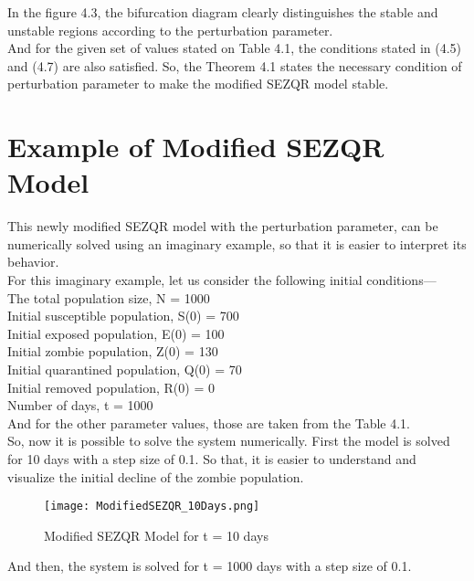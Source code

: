 In the figure 4.3, the bifurcation diagram clearly distinguishes the stable and unstable regions according to the perturbation parameter. \\

And for the given set of values stated on Table 4.1, the conditions stated in (4.5) and (4.7) are also satisfied. So, the Theorem 4.1 states the necessary condition of perturbation parameter to make the modified SEZQR model stable.

\pagebreak
\section{Example of Modified SEZQR Model}

This newly modified SEZQR model with the perturbation parameter, can be numerically solved using an imaginary example, so that it is easier to interpret its behavior. \\

\noindent For this imaginary example, let us consider the following initial conditions--- \\

\noindent The total population size, N = 1000 \\
Initial susceptible population, S(0) = 700 \\
Initial exposed population, E(0) = 100 \\
Initial zombie population, Z(0) = 130 \\
Initial quarantined population, Q(0) = 70 \\
Initial removed population, R(0) = 0 \\
Number of days, t = 1000 \\

And for the other parameter values, those are taken from the Table 4.1. \\

So, now it is possible to solve the system numerically. First the model is solved for 10 days with a step size of 0.1. So that, it is easier to understand and visualize the initial decline of the zombie population. \\

\begin{figure}[H]
\centering
\texttt{[image: ModifiedSEZQR\_10Days.png]}
\caption{Modified SEZQR Model for t = 10 days}
\label{fig:Modified SEZQR 10 days}
\end{figure}

And then, the system is solved for t = 1000 days with a step size of 0.1. \\

